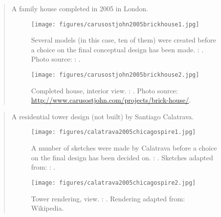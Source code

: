 		
\clearpage
{}
		\begin{quote}
		\small
		A family house completed in 2005 in London.
		\begin{figure}[htb]
		\begin{center}
		\texttt{[image: figures/carusostjohn2005brickhouse1.jpg]}
		\caption{
		Several models (in this case, ten of them) were created before a choice on the final conceptual design has been made.
		\citeauthor{carusostjohn2005brickhouse}: 
		\cite{carusostjohn2005brickhouse}.
		Photo source: 
		\citeauthor{bell2010thenewmodernhouse}: 
		\cite{bell2010thenewmodernhouse}. 
		}		
		\label{fig:carusostjohn2005brickhouse1}
		\end{center}
		\end{figure}
				
		\begin{figure}[htb]
		\begin{center}
		\texttt{[image: figures/carusostjohn2005brickhouse2.jpg]}
		\caption{
		Completed house, interior view.
		\citeauthor{carusostjohn2005brickhouse}: 
		\cite{carusostjohn2005brickhouse}.
		Photo source: \url{http://www.carusostjohn.com/projects/brick-house/}.
		}		
		\label{fig:carusostjohn2005brickhouse2}
		\end{center}
		\end{figure}
		
		\end{quote}
		

\clearpage
{}
		\begin{quote}
		\small
		A residential tower design (not built) by Santiago Calatrava.
		\begin{figure}[htb]
		\begin{center}
		\texttt{[image: figures/calatrava2005chicagospire1.jpg]}
		\caption{
		A number of sketches were made by Calatrava before a choice on the final design has been decided on.
		\citeauthor{calatrava2005chicagospire}: 
		\cite{calatrava2005chicagospire}.
		Sketches adapted from: 
		\citeauthor{jodidio2009calatrava}: 
		\cite{jodidio2009calatrava}. 
		}		
		\label{fig:jodidio2009calatrava1}
		\end{center}
		\end{figure}
				
		\begin{figure}[htb]
		\begin{center}
		\texttt{[image: figures/calatrava2005chicagospire2.jpg]}
		\caption{
		Tower rendering, view.
		\citeauthor{calatrava2005chicagospire}: 
		\cite{calatrava2005chicagospire}.
		Rendering adapted from: Wikipedia.
		}		
		\label{fig:calatrava2005chicagospire2}
		\end{center}
		\end{figure}
		
		\end{quote}
		
